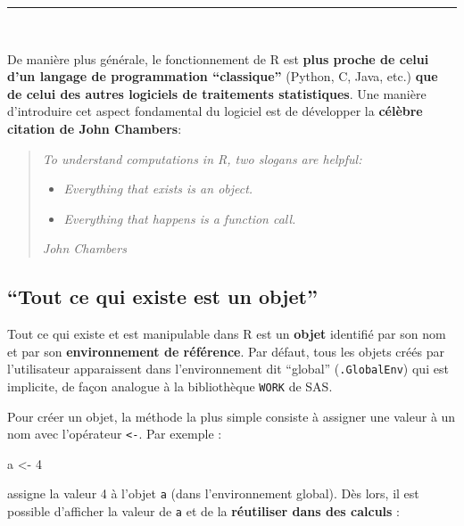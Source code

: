 \documentclass[12pt,twosided, notitlepage]{book}
\newenvironment{Shaded}{}{}
\newcommand{\DecValTok}[1]{{#1}}
\newcommand{\StringTok}[1]{\textcolor[rgb]{0.00,0.50,0.50}{{#1}}}
\newcommand{\NormalTok}[1]{{#1}}
\renewenvironment{Shaded}{\begin{snugshade}}{\end{snugshade}}
\begin{document}
\begin{center}\rule{0.5\linewidth}{\linethickness}\end{center}

~

De manière plus générale, le fonctionnement de R est \textbf{plus proche
de celui d'un langage de programmation \enquote{classique}} (Python, C,
Java, etc.) \textbf{que de celui des autres logiciels de traitements
statistiques}. Une manière d'introduire cet aspect fondamental du
logiciel est de développer la \textbf{célèbre citation de John
Chambers}:

\begin{quote}
\emph{To understand computations in R, two slogans are helpful:}

\begin{itemize}
\item
  \emph{Everything that exists is an object.}
\item
  \emph{Everything that happens is a function call.}
\end{itemize}

\emph{John Chambers}
\end{quote}

\subsection{\texorpdfstring{\enquote{Tout ce qui existe est un
objet}}{Tout ce qui existe est un objet}}\label{tout-ce-qui-existe-est-un-objet}

Tout ce qui existe et est manipulable dans R est un \textbf{objet}
identifié par son nom et par son \textbf{environnement de référence}.
Par défaut, tous les objets créés par l'utilisateur apparaissent dans
l'environnement dit \enquote{global} (\texttt{.GlobalEnv}) qui est
implicite, de façon analogue à la bibliothèque \texttt{WORK} de SAS.

Pour créer un objet, la méthode la plus simple consiste à assigner une
valeur à un nom avec l'opérateur
\texttt{\textless{}-}. Par exemple :

\begin{Shaded}
\begin{Highlighting}[]
\NormalTok{a <-}\StringTok{ }\DecValTok{4}
\end{Highlighting}
\end{Shaded}

assigne la valeur 4 à l'objet \texttt{a} (dans l'environnement global).
Dès lors, il est possible d'afficher la valeur de \texttt{a} et de la
\textbf{réutiliser dans des calculs} :
\end{document}
